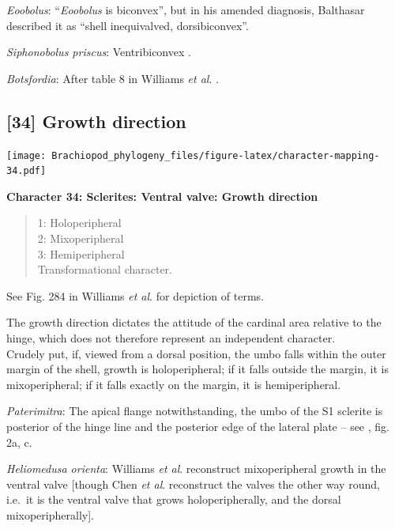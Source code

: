 \documentclass[openany]{book}
\theoremstyle{definition}
\theoremstyle{definition}
\theoremstyle{definition}
\theoremstyle{remark}
\begin{document}
\emph{Eoobolus}: ``\emph{Eoobolus} is biconvex'', but in his amended
diagnosis, Balthasar \citeyearpar{Balthasar2009Thebrachiopod} described
it as ``shell inequivalved, dorsibiconvex''.

\emph{Siphonobolus priscus}: Ventribiconvex
\citep{Popov2009Earlyontogeny}.

\emph{Botsfordia}: After table 8 in Williams \emph{et al}.
\citeyearpar{Williams2000BrachiopodaLinguliformea}.

\hypertarget{growth-direction-1}{%
\subsection*{{[}34{]} Growth direction}\label{growth-direction-1}}

\texttt{[image: Brachiopod\_phylogeny\_files/figure-latex/character-mapping-34.pdf]}

\textbf{Character 34: Sclerites: Ventral valve: Growth direction}

\begin{quote}
1: Holoperipheral\\
2: Mixoperipheral\\
3: Hemiperipheral\\
Transformational character.
\end{quote}

See Fig. 284 in Williams \emph{et al}.
\citeyearpar{Williams1997BrachiopodaRevised} for depiction of terms.

The growth direction dictates the attitude of the cardinal area relative
to the hinge, which does not therefore represent an independent
character.\\
Crudely put, if, viewed from a dorsal position, the umbo falls within
the outer margin of the shell, growth is holoperipheral; if it falls
outside the margin, it is mixoperipheral; if it falls exactly on the
margin, it is hemiperipheral.

\emph{Paterimitra}: The apical flange notwithstanding, the umbo of the
S1 sclerite is posterior of the hinge line and the posterior edge of the
lateral plate -- see \citet{Larsson2014iPaterimitra}, fig. 2a, c.

\emph{Heliomedusa orienta}: Williams \emph{et al}.
\citeyearpar[2007]{Williams2000BrachiopodaLinguliformea} reconstruct
mixoperipheral growth in the ventral valve {[}though Chen \emph{et al}.
\citeyearpar{Chen2007Reinterpretationof} reconstruct the valves the
other way round, i.e.~it is the ventral valve that grows
holoperipherally, and the dorsal mixoperipherally{]}.
\end{document}
